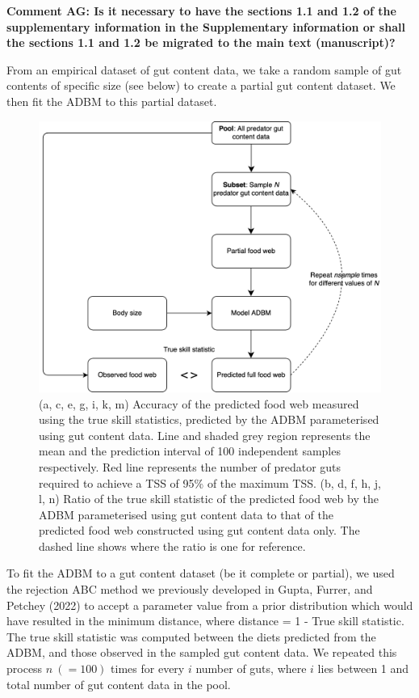 \documentclass{article}
\begin{document}
\textbf{Comment AG: Is it necessary to have the sections 1.1 and 1.2 of
the supplementary information in the Supplementary information or shall
the sections 1.1 and 1.2 be migrated to the main text (manuscript)?}

From an empirical dataset of gut content data, we take a random sample
of gut contents of specific size (see below) to create a partial gut
content dataset. We then fit the ADBM to this partial dataset.

\begin{figure}

{\centering \includegraphics[width=500px]{../../manuscript/fig/ms_C2(1)} 

}

\caption{\label{fig:fig_ra} (a, c, e, g, i, k, m) Accuracy of the predicted food web measured using the true skill statistics, predicted by the ADBM parameterised using gut content data. Line and shaded grey region represents the mean and the prediction interval of 100 independent samples respectively. Red line represents the number of predator guts required to achieve a TSS of 95\% of the maximum TSS. (b, d, f, h, j, l, n) Ratio of the true skill statistic of the predicted food web by the ADBM parameterised using gut content data to that of the predicted food web constructed using gut content data only. The dashed line shows where the ratio is one for reference.}\label{fig:unnamed-chunk-1}
\end{figure}

To fit the ADBM to a gut content dataset (be it complete or partial), we
used the rejection ABC method we previously developed in Gupta, Furrer,
and Petchey (2022) to accept a parameter value from a prior distribution
which would have resulted in the minimum distance, where distance = 1 -
True skill statistic. The true skill statistic was computed between the
diets predicted from the ADBM, and those observed in the sampled gut
content data. We repeated this process \(n~(= 100)\) times for every
\(i\) number of guts, where \(i\) lies between 1 and total number of gut
content data in the pool.
\end{document}
